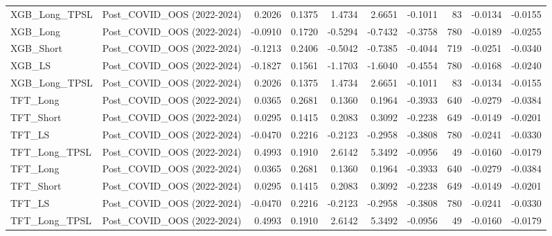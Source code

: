 \begin{tabular}{llrrrrrrrr}
XGB\_Long\_TPSL & Post\_COVID\_OOS (2022-2024) & 0.2026 & 0.1375 & 1.4734 & 2.6651 & -0.1011 & 83 & -0.0134 & -0.0155 \\
\cline{1-10}
XGB\_Long & Post\_COVID\_OOS (2022-2024) & -0.0910 & 0.1720 & -0.5294 & -0.7432 & -0.3758 & 780 & -0.0189 & -0.0255 \\
\cline{1-10}
XGB\_Short & Post\_COVID\_OOS (2022-2024) & -0.1213 & 0.2406 & -0.5042 & -0.7385 & -0.4044 & 719 & -0.0251 & -0.0340 \\
\cline{1-10}
XGB\_LS & Post\_COVID\_OOS (2022-2024) & -0.1827 & 0.1561 & -1.1703 & -1.6040 & -0.4554 & 780 & -0.0168 & -0.0240 \\
\cline{1-10}
XGB\_Long\_TPSL & Post\_COVID\_OOS (2022-2024) & 0.2026 & 0.1375 & 1.4734 & 2.6651 & -0.1011 & 83 & -0.0134 & -0.0155 \\
\cline{1-10}
TFT\_Long & Post\_COVID\_OOS (2022-2024) & 0.0365 & 0.2681 & 0.1360 & 0.1964 & -0.3933 & 640 & -0.0279 & -0.0384 \\
\cline{1-10}
TFT\_Short & Post\_COVID\_OOS (2022-2024) & 0.0295 & 0.1415 & 0.2083 & 0.3092 & -0.2238 & 649 & -0.0149 & -0.0201 \\
\cline{1-10}
TFT\_LS & Post\_COVID\_OOS (2022-2024) & -0.0470 & 0.2216 & -0.2123 & -0.2958 & -0.3808 & 780 & -0.0241 & -0.0330 \\
\cline{1-10}
TFT\_Long\_TPSL & Post\_COVID\_OOS (2022-2024) & 0.4993 & 0.1910 & 2.6142 & 5.3492 & -0.0956 & 49 & -0.0160 & -0.0179 \\
\cline{1-10}
TFT\_Long & Post\_COVID\_OOS (2022-2024) & 0.0365 & 0.2681 & 0.1360 & 0.1964 & -0.3933 & 640 & -0.0279 & -0.0384 \\
\cline{1-10}
TFT\_Short & Post\_COVID\_OOS (2022-2024) & 0.0295 & 0.1415 & 0.2083 & 0.3092 & -0.2238 & 649 & -0.0149 & -0.0201 \\
\cline{1-10}
TFT\_LS & Post\_COVID\_OOS (2022-2024) & -0.0470 & 0.2216 & -0.2123 & -0.2958 & -0.3808 & 780 & -0.0241 & -0.0330 \\
\cline{1-10}
TFT\_Long\_TPSL & Post\_COVID\_OOS (2022-2024) & 0.4993 & 0.1910 & 2.6142 & 5.3492 & -0.0956 & 49 & -0.0160 & -0.0179 \\
\cline{1-10}
\bottomrule
\end{tabular}

